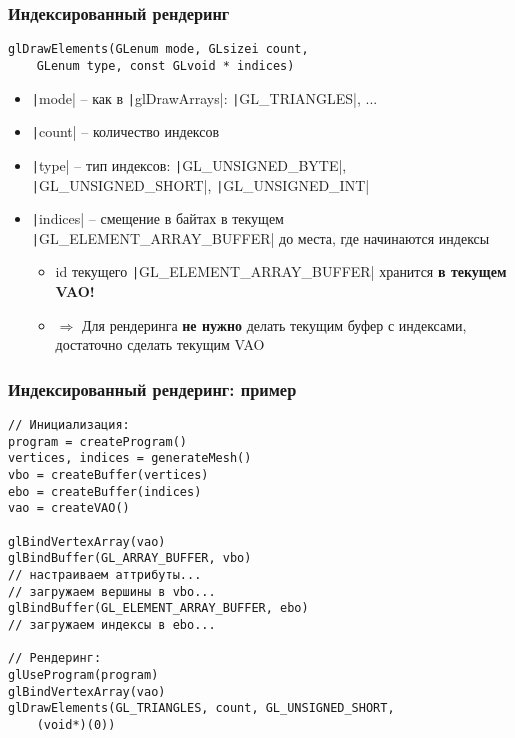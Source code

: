 \documentclass[10pt]{beamer}
\begin{document}
\begin{frame}[fragile]
\frametitle{Индексированный рендеринг}
\begin{verbatim}
glDrawElements(GLenum mode, GLsizei count,
    GLenum type, const GLvoid * indices)
\end{verbatim}
\pause
\begin{itemize}
\item \texttt|mode| -- как в \texttt|glDrawArrays|: \texttt|GL_TRIANGLES|, ...
\pause
\item \texttt|count| -- количество индексов
\pause
\item \texttt|type| -- тип индексов: \texttt|GL_UNSIGNED_BYTE|, \texttt|GL_UNSIGNED_SHORT|, \texttt|GL_UNSIGNED_INT|
\pause
\item \texttt|indices| -- смещение в байтах в текущем \texttt|GL_ELEMENT_ARRAY_BUFFER| до места, где начинаются индексы
\pause
\begin{itemize}
\item id текущего \texttt|GL_ELEMENT_ARRAY_BUFFER| хранится \alert{\textbf{в текущем VAO!}}
\pause
\item \begin{math}\Longrightarrow\end{math} Для рендеринга \alert{\textbf{не нужно}} делать текущим буфер с индексами, достаточно сделать текущим VAO
\end{itemize}
\end{itemize}
\end{frame}

\begin{frame}[fragile]
\frametitle{Индексированный рендеринг: пример}
\begin{verbatim}
// Инициализация:
program = createProgram()
vertices, indices = generateMesh()
vbo = createBuffer(vertices)
ebo = createBuffer(indices)
vao = createVAO()

glBindVertexArray(vao)
glBindBuffer(GL_ARRAY_BUFFER, vbo)
// настраиваем аттрибуты...
// загружаем вершины в vbo...
glBindBuffer(GL_ELEMENT_ARRAY_BUFFER, ebo)
// загружаем индексы в ebo...

// Рендеринг:
glUseProgram(program)
glBindVertexArray(vao)
glDrawElements(GL_TRIANGLES, count, GL_UNSIGNED_SHORT,
    (void*)(0))
\end{verbatim}
\end{frame}
\end{document}
